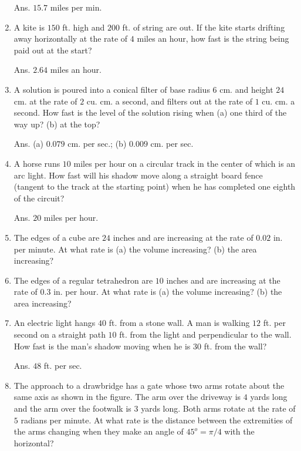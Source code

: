 \begin{enumerate}
Ans. $15.7$ miles per min.

\item
A kite is $150$ ft. high and $200$ ft. of string are out. If the 
kite starts drifting away horizontally at the rate of $4$ 
miles an hour, how fast is the string being paid out at 
the start? 

Ans. $2.64$ miles an hour.

\item
A solution is poured into a conical filter of base radius $6$ cm. 
and height $24$ cm. at the rate of $2$ cu. cm. a second, and 
filters out at the rate of $1$ cu. cm. a second. 
How fast is the level of the solution rising when 
(a) one third of the way up? (b) at the top? 

Ans. (a) $0.079$ cm. per sec.; (b) $0.009$ cm. per sec.

\item
A horse runs $10$ miles per hour on a circular track in the 
center of which is an arc light. How fast will his shadow move 
along a straight board fence (tangent to the track at the 
starting point) when he has completed one eighth of the 
circuit? 

Ans. $20$ miles per hour.

\item
The edges of a cube are $24$ inches and are increasing at the 
rate of $0.02$ in. per minute. At what rate is 
(a) the volume increasing? 
(b) the area increasing?

\item
The edges of a regular tetrahedron are $10$ inches and are 
increasing at the rate of $0.3$ in. per hour. At what rate 
is (a) the volume increasing? (b) the area increasing?

\item
An electric light hangs $40$ ft. from a stone wall. A man is 
walking $12$ ft. per second on a straight path $10$ ft. from 
the light and perpendicular to the wall. How fast is the man's 
shadow moving when he is $30$ ft. from the wall? 

Ans. $48$ ft. per sec.

\item
The approach to a drawbridge has a gate whose two arms 
rotate about the same axis as shown in the figure. The arm 
over the driveway is $4$ yards long and the arm over the footwalk 
is $3$ yards long. Both arms rotate at the rate of $5$ radians 
per minute. At what rate is the distance between the 
extremities of the arms changing when they make an angle 
of $45^o=\pi/4$ with the horizontal? 


\end{enumerate}
